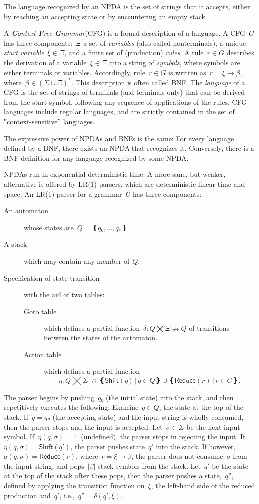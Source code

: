 The language recognized by an NPDA is the set of strings that it accepts,
  either by reaching an accepting state or by encountering an empty stack.

A \emph{\textbf Context-\textbf Free \textbf Grammar}(CFG) is a formal description of a language.
A CFG~$G$ has three components:~$Ξ$ a set of \emph{variables} (also called nonterminals),
  a unique \emph{start variable}~$ξ∈Ξ$, and a finite set of (production) \emph{rules}.
A rule~$r∈G$ describes the derivation of a variable~$ξ∈Ξ$ into
  a string of \emph{symbols}, where symbols are either terminals or variables.
Accordingly, rule~$r∈G$ is written as~$r=ξ→β$, where~$β∈\left(Σ∪Ξ\right)^*$.
This description is often called BNF\@.
The \emph{language} of a CFG is the set of strings of terminals (and terminals only)
  that can be derived from the start symbol, following any sequence of applications of the rules.
CFG languages include regular languages, and are strictly contained in the set
  of ‟context-sensitive” languages.

The expressive power of NPDAs and BNFs is the same:
  For every language defined by a BNF, there exists an NPDA that recognizes it.
Conversely, there is a BNF definition for any language recognized by some NPDA.

NPDAs run in exponential deterministic time.
A more sane, but weaker, alternative is offered by LR(1) parsers,
  which are deterministic linear time and space.
An LR(1) parser for a grammar~$G$ has three components:
\begin{description}
  \item[An automaton] whose states are~$Q=❴q₀,…,qₙ❵$
  \item[A stack] which may contain any member of~$Q$.
  \item[Specification of state transition] with the aid of two tables:
        \begin{description}
          \item[Goto table] which defines a partial function~$δ:Q⨉Ξ↛Q$ of transitions
          between the states of the automaton.
          \item[Action table] which
            defines a partial function\[η:Q⨉Σ↛ ❴ \textsf{Shift}(q) \,|\, q∈Q❵ ∪ ❴\textsf{Reduce}(r) \,| \, r∈G❵.\]
        \end{description}
\end{description}
The parser begins by pushing~$q₀$ (the initial state) into the stack,
and then repetitively executes the following:
Examine~$q∈Q$, the state at the top of the stack.
If~$q=qₙ$ (the accepting state) and the input string is wholly consumed, then the parser stops and the input is accepted.
Let~$σ∈Σ$ be the next input symbol.
If~$η(q,σ)=⊥$ (undefined), the parser stops in rejecting the input.
If~$η(q,σ) = \textsf{Shift}(q')$, the parser pushes state~$q'$ into the stack.
If however,~$a(q,σ) = \textsf{Reduce}(r)$,
where~$r=ξ→β$, the parser does not consume~$σ$ from the input string,
  and pops~$|β|$ stack symbols from the stack.
Let~$q'$ be the state at the top of the stack after these pops, then
  the parser pushes a state,~$q”$,
  defined by applying the transition function on~$ξ$, the left-hand side of the reduced production and~$q'$, i.e.,~$q”=δ(q',ξ)$.

